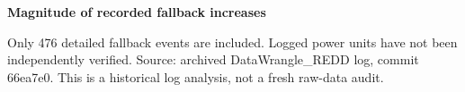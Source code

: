 \documentclass[border=7mm]{standalone}
\begin{document}
\begin{minipage}{6.6in}
\centering
{\large\bfseries Magnitude of recorded fallback increases\par}
\vspace{5mm}

\vspace{2mm}
{\small\raggedright Only 476 detailed fallback events are included. Logged power units have not been independently verified. Source: archived DataWrangle\_REDD log, commit 66ea7e0. This is a historical log analysis, not a fresh raw-data audit.\par}
\end{minipage}
\end{document}

